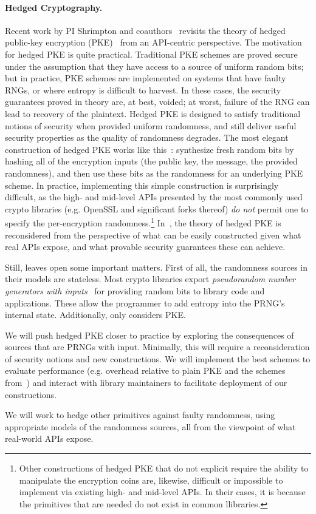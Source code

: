 \paragraph{Hedged Cryptography. }
Recent work by PI Shrimpton and coauthors~\cite{BPS} revisits the theory of
hedged public-key encryption (PKE)~\cite{BBN+} from an API-centric perspective.
%
The motivation for hedged PKE is quite practical. Traditional PKE schemes are
proved secure under the assumption that they have access to a source of uniform
random bits; but in practice, PKE schemes are implemented on systems that have
faulty RNGs, or where entropy is difficult to harvest.  In these cases, the
security guarantees proved in theory are, at best, voided; at worst, failure of
the RNG can lead to recovery of the plaintext.
%
Hedged PKE is designed to satisfy traditional notions of security when provided
uniform randomness, and still deliver useful security properties as the quality
of randomness degrades.  The most elegant construction of hedged PKE works like
this~\cite{BBN+,BH15}: synthesize fresh random bits by hashing all of the
encryption inputs (the public key, the message, the provided randomness), and
then use these bits as the randomness for an underlying PKE scheme.  In
practice, implementing this simple construction is surprisingly difficult, as
the high- and mid-level APIs presented by the most commonly used crypto
libraries (e.g. OpenSSL and significant forks thereof) \emph{do not} permit one
to specify the per-encryption randomness.\footnote{Other constructions of hedged
PKE that do not explicit require the ability to manipulate the encryption coins
are, likewise, difficult or impossible to implement via existing high- and
mid-level APIs.  In their cases, it is because the primitives that are needed do
not exist in common llibraries.}
In~\cite{BPS}, the theory of hedged
PKE is reconsidered from the perspective of what can be easily constructed given
what real APIs expose, and what provable security guarantees these can
achieve.

Still, \cite{BPS} leaves open some important matters.  First of all, the
randomness sources in their models are stateless.  Most crypto libraries export
\emph{pseudorandom number generators with inputs}~\cite{BH05,DPR+13,ST15} for
providing random bits to library code and applications. These allow the
programmer to add entropy into the PRNG's internal state.  Additionally,
\cite{BPS} only considers PKE.


\begin{task}
We will push hedged PKE closer to practice by exploring the
consequences of sources that are PRNGs with input.  Minimally, this will require
a reconsideration of security notions and new constructions.  We will
implement the best schemes to evaluate performance (e.g. overhead
relative to plain PKE and the schemes from~\cite{BPS}) and interact
with library maintainers to facilitate deployment of our constructions.
\end{task}

\begin{task}
We will work to hedge other primitives against faulty randomness,
using appropriate models of the randomness sources, all from the
viewpoint of what real-world APIs expose.
\end{task}
